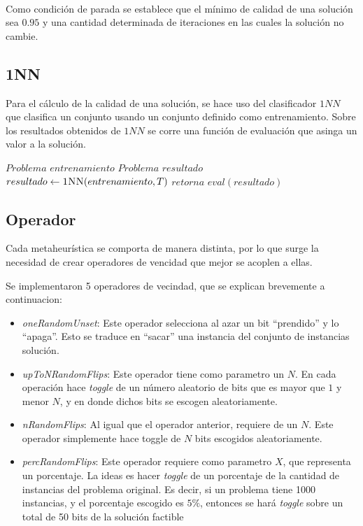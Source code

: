 \documentclass[11pt]{article}
\begin{document}
    ~\ 

    Como condición de parada se establece que el mínimo de calidad de una solución sea $0.95$ y una cantidad determinada de iteraciones en las cuales la solución no cambie.

\subsection{1NN}
    Para el cálculo de la calidad de una solución, se hace uso del clasificador $1NN$ que clasifica un conjunto usando un conjunto definido como entrenamiento. Sobre los resultados obtenidos de $1NN$ se corre una función de evaluación que asinga un valor a la solución. \\

    {\fontsize{10}{10}\selectfont
    \begin{algorithmic}
            \State $Problema$  $entrenamiento$
            \State $Problema$  $resultado$
            \State $resultado \gets \Call{1NN}{entrenamiento, T}$
            \State $retorna$ $eval(resultado)$
        \EndFunction
    \end{algorithmic}
    }


\subsection{Operador}

Cada metaheurística se comporta de manera distinta, por lo
que surge la necesidad de crear operadores de vencidad
que mejor se acoplen a ellas.

Se implementaron 5 operadores de vecindad, que se explican brevemente
a continuacion:

\begin{itemize}
  \item \emph{oneRandomUnset}:
    Este operador selecciona al
    azar un bit ``prendido'' y lo ``apaga''. Esto se traduce
    en ``sacar'' una instancia del conjunto de instancias solución.
  \item \emph{upToNRandomFlips}: Este operador tiene como parametro
    un $N$. En cada operación hace \emph{toggle} de un número aleatorio 
    de bits que es mayor que $1$ y menor $N$, y en donde dichos bits 
    se escogen aleatoriamente.
  \item \emph{nRandomFlips}: Al igual que el operador anterior, 
    requiere de un $N$. Este operador simplemente hace toggle de $N$ bits 
    escogidos aleatoriamente.
  \item \emph{percRandomFlips}: Este operador requiere como parametro $X$, que 
    representa un porcentaje. La ideas es hacer \emph{toggle} de un porcentaje de la
    cantidad de instancias del problema original. Es decir, si un problema tiene 1000
    instancias, y el porcentaje escogido es $5 \%$, entonces se hará \emph{toggle} 
    sobre un total de 50 bits de la solución factible
\end{itemize}
\end{document}
